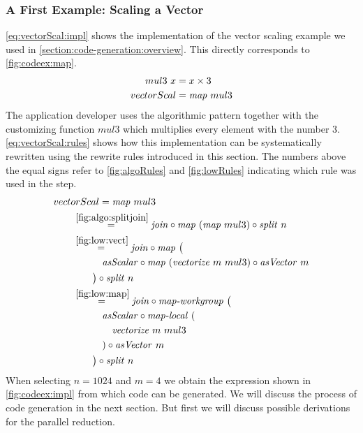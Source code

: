 \subsubsection{A First Example: Scaling a Vector}
\autoref{eq:vectorScal:impl} shows the implementation of the vector scaling example we used in \autoref{section:code-generation:overview}.
This directly corresponds to \autoref{fig:codeex:map}.
\begin{align}
  mul3\ x &= x \times 3\nonumber\\
  vectorScal &= \text{\textit{map}}\ mul3
  \label{eq:vectorScal:impl}
\end{align}
The application developer uses the algorithmic pattern \map together with the customizing function $mul3$ which multiplies every element with the number $3$.
\autoref{eq:vectorScal:rules} shows how this implementation can be systematically rewritten using the rewrite rules introduced in this section.
The numbers above the equal signs refer to \autoref{fig:algoRules} and \autoref{fig:lowRules} indicating which rule was used in the step.
\begin{align}
  &vectorScal = \map\ mul3\nonumber\\
  &\qquad\begin{aligned}
    &\overset{\ref{fig:algo:splitjoin}}{=\hspace{.2em}} \join \circ \map\ (\map\ mul3) \circ \splitN\ n\\
    &\overset{\ref{fig:low:vect}}{=\hspace{.2em}} \join \circ \map\ \big(\\
      &\qquad\quad \asScalar \circ \map\ (\vect\ m\ mul3) \circ \asVector\ m\\
      &\qquad\big) \circ \splitN\ n\\
    &\overset{\ref{fig:low:map}}{=\hspace{.2em}} \join \circ \mapWorkgroup\ \big(\\
      &\qquad\quad \asScalar \circ \mapLocal\ (\\
      &\qquad\qquad\vect\ m\ mul3\\
      &\qquad\quad) \circ \asVector\ m\\
      &\qquad\big) \circ \splitN\ n
  \end{aligned}
  \label{eq:vectorScal:rules}
\end{align}
When selecting $n=1024$ and $m=4$ we obtain the expression shown in \autoref{fig:codeex:impl} from which \OpenCL code can be generated.
We will discuss the process of \OpenCL code generation in the next section.
But first we will discuss possible derivations for the parallel reduction.

